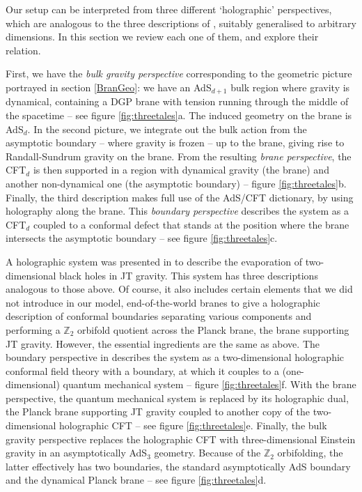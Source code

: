 %

Our setup can be interpreted from three different `holographic' perspectives, which are analogous to the three descriptions of \cite{Almheiri:2019hni} , suitably generalised to arbitrary dimensions.  In this section we review each one of them, and explore their relation. 

First, we have the {\it bulk gravity perspective} corresponding to the geometric picture portrayed in section \ref{BranGeo}: we have an AdS$_{d+1}$ bulk region where gravity is dynamical, containing a DGP brane with tension running through the middle of the spacetime  -- see figure \ref{fig:threetales}a. The induced geometry on the brane is AdS$_d$. In the second picture, we integrate out the bulk action from the asymptotic boundary -- where gravity is frozen -- up to the brane, giving rise to Randall-Sundrum gravity \cite{Randall:1999vf,Randall:1999ee} on the brane. From the resulting {\it brane perspective}, the CFT$_d$ is then supported in a region with dynamical gravity (\ie the brane) and another non-dynamical one (\ie the asymptotic boundary) -- figure \ref{fig:threetales}b. Finally, the third description makes full use of the AdS/CFT dictionary, by using holography {along} the brane. This {\it boundary perspective} describes the system as a CFT$_d$ coupled to a conformal defect that stands at the position where the brane intersects the asymptotic boundary -- see figure \ref{fig:threetales}c. 

A holographic system was presented in \cite{Almheiri:2019hni} to describe the evaporation of two-dimensional black holes in JT gravity. This system has three descriptions analogous to those above. Of course, it also includes certain elements that we did not introduce in our model, \ie end-of-the-world branes to give a holographic description of conformal boundaries separating various components  \cite{Takayanagi:2011zk,Fujita:2011fp} and performing a $\mathbb Z_2$ orbifold quotient across the Planck brane, \ie the brane supporting JT gravity. However, the essential ingredients are the same as above. The boundary perspective in \cite{Almheiri:2019hni} describes the system as a two-dimensional holographic conformal field theory with a boundary, at which it couples to a (one-dimensional) quantum mechanical system -- figure \ref{fig:threetales}f. With the brane perspective, the quantum mechanical system is replaced by its holographic dual, the Planck brane supporting JT gravity coupled to another copy of the two-dimensional holographic CFT -- see figure \ref{fig:threetales}e. Finally, the bulk gravity perspective replaces the holographic CFT with three-dimensional Einstein gravity in an asymptotically AdS$_3$ geometry. Because of the $\mathbb Z_2$ orbifolding, the latter effectively has two boundaries, the standard asymptotically AdS boundary and the dynamical Planck brane -- see figure \ref{fig:threetales}d.

